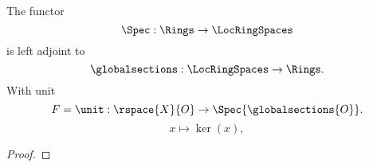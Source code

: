 \begin{lemma}
The functor \[\Spec: \Rings \rightarrow \LocRingSpaces\]
is left adjoint to \[\globalsections: \LocRingSpaces \rightarrow \Rings.\]
With unit 
\[ F = \unit : \rspace{X}{O} \rightarrow \Spec{\globalsections{O}}.\]
\[ x \mapsto \ker(x),\]
\end{lemma}

\begin{proof}
\end{proof}